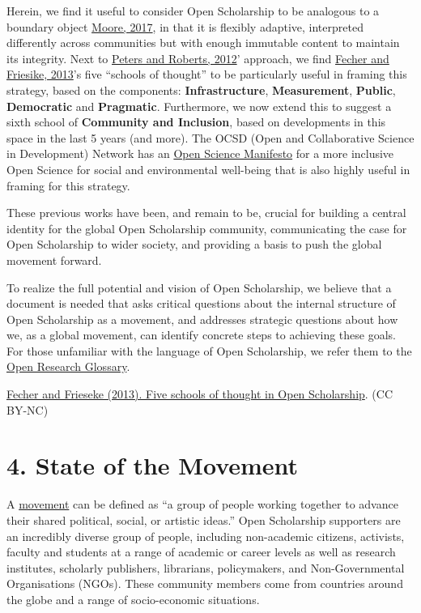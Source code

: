Herein, we find it useful to consider Open Scholarship to be analogous
to a boundary object
\href{https://journals.openedition.org/rfsic/3220}{Moore, 2017}, in that
it is flexibly adaptive, interpreted differently across communities but
with enough immutable content to maintain its integrity. Next to
\href{https://www.routledge.com/Virtues-of-Openness-Education-Science-and-Scholarship-in-the-Digital/Peters-Roberts/p/book/9781594516863}{Peters
and Roberts, 2012}' approach, we find
\href{https://doi.org/10.1007/978-3-319-00026-8_2}{Fecher and Friesike,
2013}'s five ``schools of thought'' to be particularly useful in framing
this strategy, based on the components: \textbf{Infrastructure},
\textbf{Measurement}, \textbf{Public}, \textbf{Democratic} and
\textbf{Pragmatic}. Furthermore, we now extend this to suggest a sixth
school of \textbf{Community and Inclusion}, based on developments in
this space in the last 5 years (and more). The OCSD (Open and
Collaborative Science in Development) Network has an
\href{https://ocsdnet.org/manifesto/open-science-manifesto/}{Open
Science Manifesto} for a more inclusive Open Science for social and
environmental well-being that is also highly useful in framing for this
strategy.

These previous works have been, and remain to be, crucial for building a
central identity for the global Open Scholarship community,
communicating the case for Open Scholarship to wider society, and
providing a basis to push the global movement forward.

To realize the full potential and vision of Open Scholarship, we believe
that a document is needed that asks critical questions about the
internal structure of Open Scholarship as a movement, and addresses
strategic questions about how we, as a global movement, can identify
concrete steps to achieving these goals. For those unfamiliar with the
language of Open Scholarship, we refer them to the
\href{http://www.righttoresearch.org/resources/openresearchglossary/}{Open
Research Glossary}.

\href{https://www.fosteropenscience.eu/content/what-open-science-introduction}{Fecher
and Frieseke (2013). Five schools of thought in Open Scholarship}. (CC
BY-NC)

\section{4. State of the Movement }\label{state-of-the-movement}

A
\href{https://www.google.de/search?q=Dictionary\#dobs=movement}{movement}
can be defined as ``a group of people working together to advance their
shared political, social, or artistic ideas.'' Open Scholarship
supporters are an incredibly diverse group of people, including
non-academic citizens, activists, faculty and students at a range of
academic or career levels as well as research institutes, scholarly
publishers, librarians, policymakers, and Non-Governmental Organisations
(NGOs). These community members come from countries around the globe and
a range of socio-economic situations.

